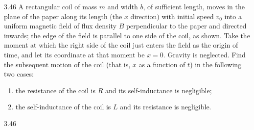 \begin{problem}{3.46}
A rectangular coil of mass $m$ and width $b$, of sufficient length, moves in the plane of the paper along its length (the $x$ direction) with initial speed $v_0$ into a uniform magnetic field of flux density $B$ perpendicular to the paper and directed inwards; the edge of the field is parallel to one side of the coil, as shown. Take the moment at which the right side of the coil just enters the field as the origin of time, and let its coordinate at that moment be $x=0$. Gravity is neglected. Find the subsequent motion of the coil (that is, $x$ as a function of $t$) in the following two cases:
\begin{enumerate}[label=(\arabic*),leftmargin=2.2em,itemsep=1pt,topsep=2pt]
\item the resistance of the coil is $R$ and its self-inductance is negligible;
\item the self-inductance of the coil is $L$ and its resistance is negligible.
\end{enumerate}
\end{problem}

\begin{figbox}{3.46}
\end{figbox}

